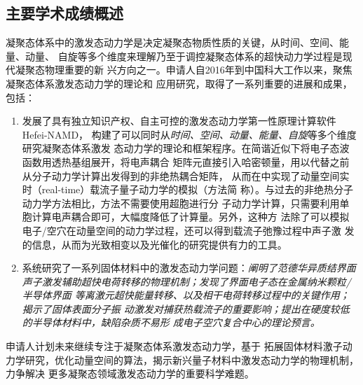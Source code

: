 \vspace{-20pt}

\subsection*{主要学术成绩概述}

凝聚态体系中的激发态动力学是决定凝聚态物质性质的关键，从时间、空间、能量、动量、
自旋等多个维度来理解乃至于调控凝聚态体系的超快动力学过程是现代凝聚态物理重要的新
兴方向之一。申请人自{\large{}2016}年到中国科大工作以来，聚焦凝聚态体系激发态动力学的理论和
应用研究，取得了一系列重要的进展和成果，包括：

\begin{enumerate}
[
  leftmargin=15pt
]
  
\item 发展了具有独立知识产权、自主可控的激发态动力学第一性原理计算软件Hefei-NAMD，
  构建了可以同时从\emph{时间、空间、动量、能量、自旋}等多个维度研究凝聚态体系激发
  态动力学的理论和框架程序。在简谐近似下将电子态波函数用透热基组展开，将电声耦合
  矩阵元直接引入哈密顿量，用以代替之前从分子动力学计算出发得到的非绝热耦合矩阵，
  从而在\hnamd{}中实现了动量空间实时（real-time）载流子量子动力学的模拟（方法简
  称\namdk{}）。与过去的非绝热分子动力学方法相比，\namdk{}方法不需要使用超胞进行分
  子动力学计算，只需要利用单胞计算电声耦合即可，大幅度降低了计算量。另外，这种方
  法除了可以模拟电子/空穴在动量空间的动力学过程，还可以得到载流子弛豫过程中声子激
  发的信息，从而为光致相变以及光催化的研究提供有力的工具。
  

\item 系统研究了一系列固体材料中的激发态动力学问题：\emph{阐明了范德华异质结界面
    声子激发辅助超快电荷转移的物理机制；发现了界面电子态在金属纳米颗粒/半导体界面
    等离激元超快能量转移、以及相干电荷转移过程中的关键作用；揭示了固体表面分子振
    动激发对捕获热载流子的重要影响；提出在硬度较低的半导体材料中，缺陷杂质不易形
    成电子空穴复合中心的理论预言。}
\end{enumerate}

申请人计划未来继续专注于凝聚态体系激发态动力学，基于 \namdk{} 拓展固体材料激子动
力学研究，优化动量空间的算法，揭示新兴量子材料中激发态动力学的物理机制，力争解决
更多凝聚态领域激发态动力学的重要科学难题。

